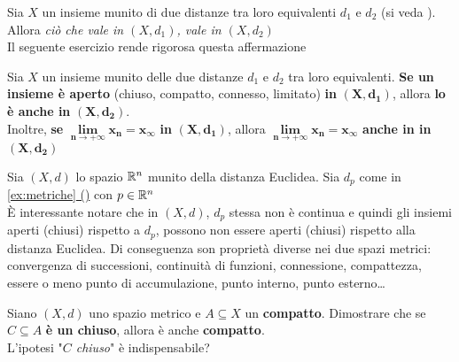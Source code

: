 \begin{observation}
	Sia $X$ un insieme munito di due distanze tra loro equivalenti $d_1$ e $d_2$ (si veda ). Allora \textit{ciò che vale in $(X, d_1)$, vale in $(X, d_2)$}\\
	Il seguente esercizio rende rigorosa questa affermazione
\end{observation}
\begin{exercise}
	\label{ex:dist_eqiv}
	Sia $X$ un insieme munito delle due distanze $d_1$ e $d_2$ tra loro equivalenti. \textbf{Se un insieme è aperto} (chiuso, compatto, connesso, limitato) \textbf{in} $\boldsymbol{(X,d_1)}$, allora \textbf{lo è anche in} $\boldsymbol{(X,d_2)}$.\\
	Inoltre, \textbf{se} $\boldsymbol{\lim\limits_{n \to +\infty} x_n = x_\infty}$ \textbf{in} $\boldsymbol{(X,d_1)}$, allora $\boldsymbol{\lim\limits_{n \to +\infty} x_n = x_\infty}$ \textbf{anche in in} $\boldsymbol{(X,d_2)}$
\end{exercise}
\begin{example}
	Sia $(X,d)$ lo spazio $\mathbb{R}^n$ munito della distanza Euclidea. Sia $d_p$ come in \hyperref[ex:dist_parigi]{\cref*{ex:metriche} ()} con $p \in \mathbb{R}^n$\\
	È interessante notare che in $(X,d)$, $d_p$ stessa non è continua e quindi gli insiemi aperti (chiusi) rispetto a $d_p$, possono non essere aperti (chiusi) rispetto alla distanza Euclidea. Di conseguenza son proprietà diverse nei due spazi metrici: convergenza di successioni, continuità di funzioni, connessione, compattezza, essere o meno punto di accumulazione, punto interno, punto esterno\dots
\end{example}
\begin{exercise}
	Siano $(X,d)$ uno spazio metrico e $A \subseteq X$ un \textbf{compatto}. Dimostrare che se $C \subseteq A$ \textbf{è un chiuso}, allora è anche \textbf{compatto}.\\
	L'ipotesi "\textit{$C$ chiuso}" è indispensabile? 
\end{exercise}

\newpage
